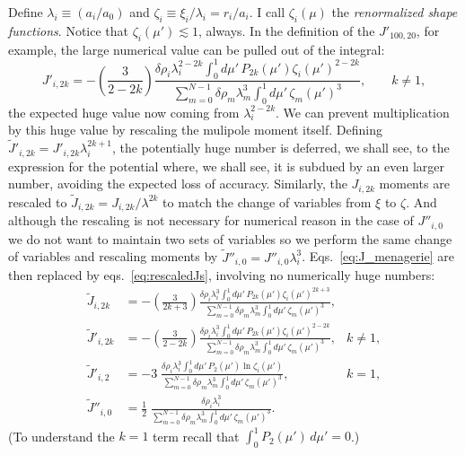 \documentclass[amsmath,amsfonts,rmp,letterpaper]{revtex4}
\newcommand{\ptk}{P_{2k}}
\newcommand{\dro}{\delta\rho}
\newcommand{\mupint}{\int_{0}^{1}d\mu'\,}
\newcommand{\Jtil}{\widetilde{J}}
\begin{document}
Define $\lambda_i\equiv(a_i/a_0)$ and $\zeta_i\equiv\xi_i/\lambda_i=r_i/a_i$. I
call $\zeta_i(\mu)$ the \emph{renormalized shape functions}. Notice that $\zeta_i
(\mu')\lesssim{1}$, always. In the definition of the $J'_{100,20}$, for example,
the large numerical value can be pulled out of the integral:
\begin{equation*}
J'_{i,2k} = -\left(\frac{3}{2 - 2k}\right)
\frac{\dro_i\lambda_i^{2 - 2k}\mupint\ptk(\mu')\zeta_i(\mu')^{2 - 2k}}
{\sum_{m=0}^{N-1}\dro_m\lambda_m^3\mupint\zeta_m(\mu')^3}, \qquad k\ne{1},
\end{equation*}
the expected huge value now coming from $\lambda_i^{2-2k}$. We can prevent
multiplication by this huge value by rescaling the mulipole moment itself.
Defining $\Jtil'_{i,2k}=J'_{i,2k}\lambda_i^{2k+1}$, the potentially huge number is
deferred, we shall see, to the expression for the potential where, we shall see,
it is subdued by an even larger number, avoiding the expected loss of accuracy.
Similarly, the $J_{i,2k}$ moments are rescaled to
$\Jtil_{i,2k}=J_{i,2k}/\lambda^{2k}$ to match the change of variables from $\xi$
to $\zeta$. And although the rescaling is not necessary for numerical reason in
the case of $J''_{i,0}$ we do not want to maintain two sets of variables so we
perform the same change of variables and rescaling moments by
$\Jtil''_{i,0}=J''_{i,0}\lambda_i^3$. Eqs.~\eqref{eq:J_menagerie} are then
replaced by eqs.~\eqref{eq:rescaledJs}, involving no numerically huge numbers:
\begin{subequations}\label{eq:rescaledJs}
\begin{align}
\Jtil_{i,2k} &= -\left(\frac{3}{2k + 3}\right)
\frac{\dro_i\lambda_i^3\mupint\ptk(\mu')\zeta_i(\mu')^{2k + 3}}
{\sum_{m=0}^{N-1}\dro_m\lambda_m^3\mupint\zeta_m(\mu')^3},\\
\Jtil'_{i,2k} &= -\left(\frac{3}{2 - 2k}\right)
\frac{\dro_i\lambda_i^3\mupint\ptk(\mu')\zeta_i(\mu')^{2 - 2k}}
{\sum_{m=0}^{N-1}\dro_m\lambda_m^3\mupint\zeta_m(\mu')^3}, & k\ne{1},\\
\Jtil'_{i,2} &= -3\;
\frac{\dro_i\lambda_i^3\mupint{}P_2(\mu')\ln{\zeta_i(\mu')}}
{\sum_{m=0}^{N-1}\dro_m\lambda_m^3\mupint\zeta_m(\mu')^3}, & k=1,\\
\Jtil''_{i,0} &= \frac{1}{2}\;
\frac{\dro_i\lambda_i^3}{\sum_{m=0}^{N-1}\dro_m\lambda_m^3\mupint\zeta_m(\mu')^3}.
\end{align}
\end{subequations}
(To understand the $k=1$ term recall that $\int_0^1P_2(\mu')\,d\mu'=0$.)
\end{document}
